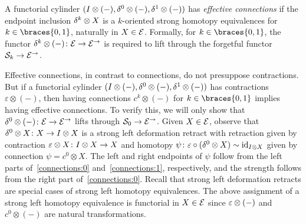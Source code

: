 \documentclass[reqno,10pt,a4paper,oneside,draft]{amsart}
\begin{document}
\begin{definition} \label{def:effective-connections}
A functorial cylinder $(I \otimes (-), \delta^0 \otimes (-), \delta^1 \otimes (-))$ has \emph{effective connections} if the endpoint inclusion $\delta^k \otimes X$ is a $k$-oriented strong homotopy equivalences for $k \in \braces{0, 1}$, naturally in $X \in \mathcal{E}$.
Formally, for $k \in \braces{0, 1}$, the functor $\delta^k \otimes (-) \colon \mathcal{E} \to \mathcal{E}^\to$ is required to lift through the forgetful functor $\mathcal{S}_k \to \mathcal{E}^\to$.
\end{definition}

\begin{remark} \label{connections-are-effective}
Effective connections, in contrast to connections, do not presuppose contractions.
But if a functorial cylinder $(I \otimes (-), \delta^0 \otimes (-), \delta^1 \otimes (-))$ has contractions $\varepsilon \otimes (-)$, then having connections $c^k \otimes (-)$ for $k \in \braces{0, 1}$ implies having effective connections.
To verify this, we will only show that $\delta^0 \otimes (-) \colon \mathcal{E} \to \mathcal{E}^\to$ lifts through $\mathcal{S}_0 \to \mathcal{E}^\to$.
Given $X \in \mathcal{E}$, observe that $\delta^0 \otimes X \colon X \to I \otimes X$ is a strong left deformation retract with retraction given by contraction $\varepsilon \otimes X \colon I \otimes X \to X$ and homotopy $\psi \colon \varepsilon \mathbin{\circ} (\delta^0 \otimes X) \sim \operatorname{id}_{I \otimes X}$ given by connection $\psi = c^0 \otimes X$.
The left and right endpoints of $\psi$ follow from the left parts of~\eqref{connections:0} and~\eqref{connections:1}, respectively, and the strength follows from the right part of~\eqref{connections:0}.
Recall that strong left deformation retracts are special cases of strong left homotopy equivalences.
The above assignment of a strong left homotopy equivalence is functorial in $X \in \mathcal{E}$ since $\varepsilon \otimes (-)$ and $c^0 \otimes (-)$ are natural transformations.
\end{remark}
\end{document}
